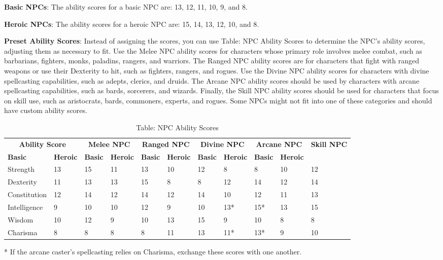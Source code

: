 \textbf{Basic NPCs}: The ability scores for a basic NPC are: 13, 12, 11, 10, 9, and 8.
				
\textbf{Heroic NPCs}: The ability scores for a heroic NPC are: 15, 14, 13, 12, 10, and 8.
				
\textbf{Preset Ability Scores}: Instead of assigning the scores, you can use Table: NPC Ability Scores to determine the NPC's ability scores, adjusting them as necessary to fit. Use the Melee NPC ability scores for characters whose primary role involves melee combat, such as barbarians, fighters, monks, paladins, rangers, and warriors. The Ranged NPC ability scores are for characters that fight with ranged weapons or use their Dexterity to hit, such as fighters, rangers, and rogues. Use the Divine NPC ability scores for characters with divine spellcasting capabilities, such as adepts, clerics, and druids. The Arcane NPC ability scores should be used by characters with arcane spellcasting capabilities, such as bards, sorcerers, and wizards. Finally, the Skill NPC ability scores should be used for characters that focus on skill use, such as aristocrats, bards, commoners, experts, and rogues. Some NPCs might not fit into one of these categories and should have custom ability scores.
				
\begin{table}[]
\sffamily
\caption{Table: NPC Ability Scores}
\begin{tabular}{llllllllllll}
\multicolumn{2}{c}{\textbf{Ability Score}} & \multicolumn{2}{c}{\textbf{Melee NPC}} & \multicolumn{2}{c}{\textbf{Ranged NPC}} & \multicolumn{2}{c}{\textbf{Divine NPC}} & \multicolumn{2}{c}{\textbf{Arcane NPC}} & \multicolumn{2}{c}{\textbf{Skill NPC}}\\
\textbf{Basic} & \textbf{Heroic} & \textbf{Basic} & \textbf{Heroic} &\textbf{Basic} & \textbf{Heroic} &\textbf{Basic} & \textbf{Heroic} &\textbf{Basic} & \textbf{Heroic} \\
Strength & 13 & 15 & 11 & 13 & 10 & 12 & 8 & 8 & 10 & 12 \\
 Dexterity & 11 & 13 & 13 & 15 & 8 & 8 & 12 & 14 & 12 & 14 \\
 Constitution & 12 & 14 & 12 & 14 & 12 & 14 & 10 & 12 & 11 & 13 \\
 Intelligence & 9 & 10 & 10 & 12 & 9 & 10 & 13* & 15* & 13 & 15 \\
 Wisdom & 10 & 12 & 9 & 10 & 13 & 15 & 9 & 10 & 8 & 8 \\
 Charisma & 8 & 8 & 8 & 8 & 11 & 13 & 11* & 13* & 9 & 10\\
\end{tabular}
* If the arcane caster's spellcasting relies on Charisma, exchange these scores with one another.\\
\end{table}

